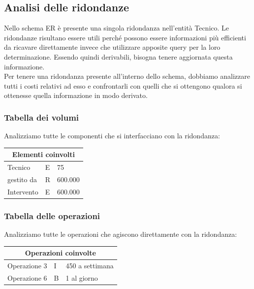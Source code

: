 \documentclass[legalpaper]{article}
\begin{document}
\subsection{Analisi delle ridondanze}
Nello schema ER è presente una singola ridondanza nell'entità Tecnico. Le ridondanze risultano essere utili perché possono essere informazioni più efficienti da ricavare direttamente invece che utilizzare apposite query per la loro determinazione. Essendo quindi derivabili, bisogna tenere aggiornata questa informazione.\\
	Per tenere una ridondanza presente all'interno dello schema, dobbiamo analizzare tutti i costi relativi ad esso e confrontarli con quelli che si ottengono qualora si ottenesse quella informazione in modo derivato.
	
	\subsubsection{Tabella dei volumi}
	Analizziamo tutte le componenti che si interfacciano con la ridondanza: \\ \newline
	\medskip
	\renewcommand\arraystretch{1,5}
	\begin{tabular}{|p{4cm}|p{4cm}|p{4cm}|}
		\hline
		\multicolumn{3}{|c|}{\textbf{Elementi coinvolti}}\\
		\hline
		Tecnico & {E} & 75\\
		\hline
		gestito da & {R} & 600.000\\
		\hline
		Intervento & {E} & 600.000\\
		\hline
	\end{tabular}
	
	\subsubsection{Tabella delle operazioni}	
	Analizziamo tutte le operazioni che agiscono direttamente con la ridondanza: \\ \newline
	\medskip
	\renewcommand\arraystretch{1,5}
	\begin{tabular}{|p{4cm}|p{4cm}|p{4cm}|}
		\hline
		\multicolumn{3}{|c|}{\textbf{Operazioni coinvolte}}\\
		\hline
		Operazione 3 & I & 450 a settimana\\
		\hline
		Operazione 6 & B & 1 al giorno\\
		\hline
	\end{tabular}
\end{document}
